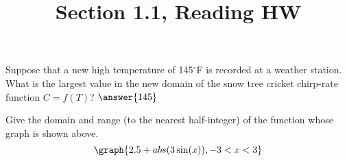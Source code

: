 \documentclass{ximera}
\title{Section 1.1, Reading HW}
\begin{document}
\begin{abstract}
\end{abstract}
\maketitle

\begin{problem}
Suppose that a new high temperature of 145\(^\circ\)F is recorded at a weather station.  What is the largest value in the new domain of the snow tree cricket chirp-rate function \(C=f(T)\)?
    $\answer{145}$

\end{problem}

\begin{problem}
   Give the domain and range (to the nearest half-integer) of the function whose graph is shown above.
   \[
    \graph{2.5+abs(3\sin(x)), -3<x<3}
   \]
   
\end{problem}
\end{document}
